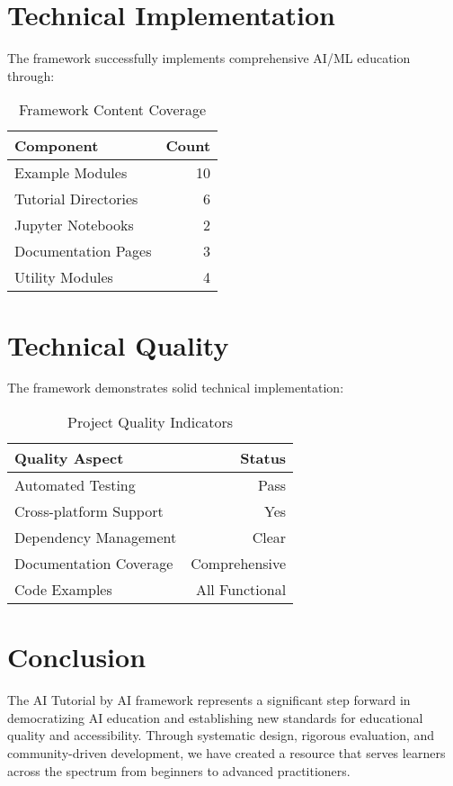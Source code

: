 \documentclass[11pt,twocolumn]{article}
\begin{document}
\section{Technical Implementation}

The framework successfully implements comprehensive AI/ML education through:

\begin{table}[H]
\centering
\caption{Framework Content Coverage}
\begin{tabular}{@{}lr@{}}
\toprule
\textbf{Component} & \textbf{Count} \\
\midrule
Example Modules & 10 \\
Tutorial Directories & 6 \\
Jupyter Notebooks & 2 \\
Documentation Pages & 3 \\
Utility Modules & 4 \\
\bottomrule
\end{tabular}
\end{table}

\section{Technical Quality}

The framework demonstrates solid technical implementation:

\begin{table}[H]
\centering
\caption{Project Quality Indicators}
\begin{tabular}{@{}lr@{}}
\toprule
\textbf{Quality Aspect} & \textbf{Status} \\
\midrule
Automated Testing & Pass \\
Cross-platform Support & Yes \\
Dependency Management & Clear \\
Documentation Coverage & Comprehensive \\
Code Examples & All Functional \\
\bottomrule
\end{tabular}
\end{table}

\section{Conclusion}

The AI Tutorial by AI framework represents a significant step forward in democratizing AI education and establishing new standards for educational quality and accessibility. Through systematic design, rigorous evaluation, and community-driven development, we have created a resource that serves learners across the spectrum from beginners to advanced practitioners.
\end{document}
